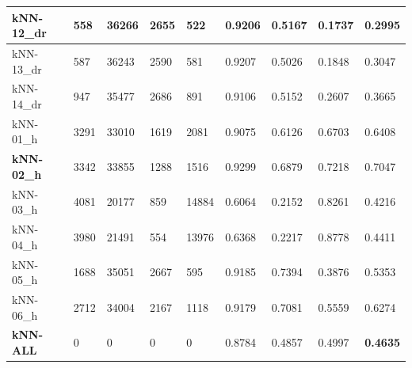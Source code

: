 \documentclass[12pt]{article}
\begin{document}
\begin{landscape}
\begin{tabular}{| l | l | l | l | l | l | l | l | l |}
			kNN-12\_dr & 558 & 36266 & 2655 & 522 & 0.9206 & 0.5167 & 0.1737 & 0.2995 \\ \hline
			kNN-13\_dr & 587 & 36243 & 2590 & 581 & 0.9207 & 0.5026 & 0.1848 & 0.3047 \\ \hline
			kNN-14\_dr & 947 & 35477 & 2686 & 891 & 0.9106 & 0.5152 & 0.2607 & 0.3665 \\ \hline
			kNN-01\_h & 3291 & 33010 & 1619 & 2081 & 0.9075 & 0.6126 & 0.6703 & 0.6408 \\ \hline
			\textbf{kNN-02\_h} & 3342 & 33855 & 1288 & 1516 & 0.9299 & 0.6879 & 0.7218 & 0.7047 \\ \hline
			kNN-03\_h & 4081 & 20177 & 859 & 14884 & 0.6064 & 0.2152 & 0.8261 & 0.4216 \\ \hline
			kNN-04\_h & 3980 & 21491 & 554 & 13976 & 0.6368 & 0.2217 & 0.8778 & 0.4411 \\ \hline
			kNN-05\_h & 1688 & 35051 & 2667 & 595 & 0.9185 & 0.7394 & 0.3876 & 0.5353 \\ \hline
			kNN-06\_h & 2712 & 34004 & 2167 & 1118 & 0.9179 & 0.7081 & 0.5559 & 0.6274 \\ \hline
			\textbf{kNN-ALL} & 0 & 0 & 0 & 0 & 0.8784 & 0.4857 & 0.4997 & \textbf{0.4635}\\ \hline
		\end{tabular}
	\end{landscape}
\end{document}
